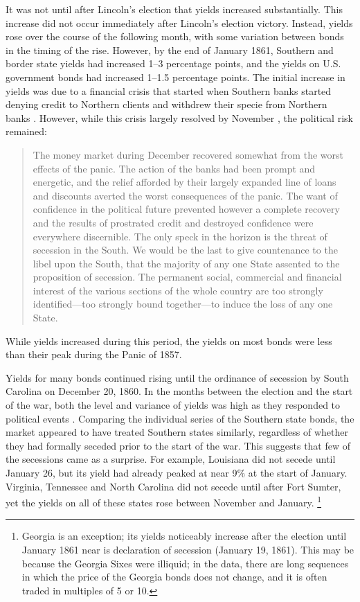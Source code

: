 \documentclass[]{article}\usepackage[]{graphicx}\usepackage[]{color}
\begin{document}
It was not until after Lincoln's election that yields increased substantially.
This increase did not occur immediately after Lincoln's election victory.
Instead, yields rose over the course of the following month, with some variation between bonds in the timing of the rise.
However, by the end of January 1861, Southern and border state yields had increased 1--3 percentage points, and the yields on U.S. government bonds had increased 1--1.5 percentage points.
The initial increase in yields was due to a financial crisis that started when Southern banks started denying credit to Northern clients and withdrew their specie from Northern banks \parencite[76]{HomansDana1861a}.
However, while this crisis largely resolved by November \parencite[539-542]{BankersMagazine1860}, the political risk remained:
\begin{quote}
  The money market during December recovered somewhat from the worst effects of the panic.
  The action of the banks had been prompt and energetic, and the relief afforded by their largely expanded line of loans and discounts averted the worst consequences of the panic.
  The want of confidence in the political future prevented however a complete recovery and the results of prostrated credit and destroyed confidence were everywhere discernible. \parencite[December 1860,][541]{BankersMagazine1860}
  The only speck in the horizon is the threat of secession in the South.
  We would be the last to give countenance to the libel upon the South, that the majority of any one State assented to the proposition of secession.
  The permanent social, commercial and financial interest of the various sections of the whole country are too strongly identified---too strongly bound together---to induce the loss of any one State. \parencites[January 1860,][419]{BankersMagazine1860}
\end{quote}
While yields increased during this period, the yields on most bonds were less than their peak during the Panic of 1857.

Yields for many bonds continued rising until the ordinance of secession by South Carolina on December 20, 1860.
In the months between the election and the start of the war, both the level and variance of yields was high as they responded to political events \parencites[718]{HuntKettellHomansEtAl1860}[78,198,416,677]{HomansDana1861a}[413,481,669,756,838]{BankersMagazine1860}.%
Comparing the individual series of the Southern state bonds, the market appeared to have treated Southern states similarly, regardless of whether they had formally seceded prior to the start of the war.
This suggests that few of the secessions came as a surprise.
For example, Louisiana did not secede until January 26, but its yield had already peaked at near 9\% at the start of January.
Virginia, Tennessee and North Carolina did not secede until after Fort Sumter, yet the yields on all of these states rose between November and January.%
\footnote{Georgia is an exception; its yields noticeably increase after the election until January 1861 near is declaration of secession (January 19, 1861).
This may be because the Georgia Sixes were illiquid; in the data, there are long sequences in which the price of the Georgia bonds does not change, and it is often traded in multiples of 5 or 10.
}
\end{document}

